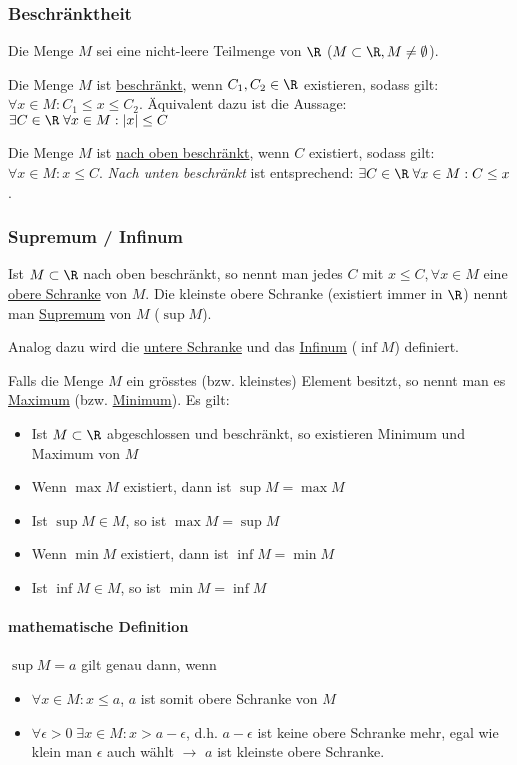 \subsubsection{Beschränktheit}
Die Menge $M$ sei eine nicht-leere Teilmenge von $\R$ ($M \subset \R, M \neq \emptyset$).

Die Menge $M$ ist \underline{beschränkt}, wenn $C_1, C_2 \in \R$ existieren, sodass gilt: $\forall x \in M: C_1 \leq x \leq C_2$.
Äquivalent dazu ist die Aussage: $\exists C \in \R \; \forall x \in M: |x| \leq C$

Die Menge $M$ ist \underline{nach oben beschränkt}, wenn $C$ existiert, sodass gilt: $\forall x \in M: x \leq C$. \textit{Nach unten beschränkt} ist
entsprechend: $\exists C \in \R \; \forall x \in M: C \leq x$.

\subsubsection{Supremum / Infinum}
Ist $M \subset \R$ nach oben beschränkt, so nennt man jedes $C$ mit $x \leq C, \forall x \in M$
eine \underline{obere Schranke} von $M$. Die kleinste obere Schranke (existiert immer in $\R$) nennt man \underline{Supremum} von $M$ ($\sup M$).

Analog dazu wird die \underline{untere Schranke} und das \underline{Infinum} ($\inf M$) definiert.

Falls die Menge $M$ ein grösstes (bzw. kleinstes) Element besitzt, so nennt man es \underline{Maximum} (bzw. \underline{Minimum}).
Es gilt:
\begin{itemize}
	\item Ist $M \subset \R$ abgeschlossen und beschränkt, so existieren Minimum und Maximum von $M$
	\item Wenn $\max M$ existiert, dann ist $\sup M = \max M$
	\item Ist $\sup M \in M$, so ist $\max M = \sup M$
	\item Wenn $\min M$ existiert, dann ist $\inf M = \min M$
	\item Ist $\inf M \in M$, so ist $\min M = \inf M$
\end{itemize}

\paragraph{mathematische Definition}
$\sup M = a$ gilt genau dann, wenn
\begin{itemize}
	\item $\forall x \in M: x \leq a$, $a$ ist somit obere Schranke von $M$
	\item $\forall \epsilon > 0 \; \exists x \in M: x > a - \epsilon$, d.h. $a - \epsilon$ ist keine obere Schranke mehr, egal wie klein man $\epsilon$ auch wählt $\rightarrow$ $a$ ist kleinste obere Schranke.
\end{itemize}

